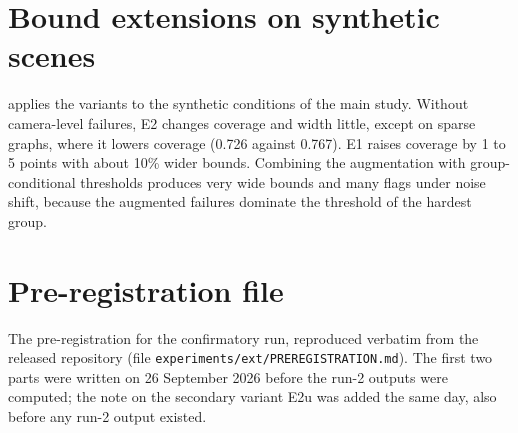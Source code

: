 \documentclass[preprint,12pt]{elsarticle}
\begin{document}
\section{Bound extensions on synthetic scenes}\label{sec:s6}
 applies the variants to the synthetic conditions of the main study. Without camera-level failures, E2 changes coverage and width little, except on sparse graphs, where it lowers coverage (0.726 against 0.767). E1 raises coverage by 1 to 5 points with about 10\% wider bounds. Combining the augmentation with group-conditional thresholds produces very wide bounds and many flags under noise shift, because the augmented failures dominate the threshold of the hardest group.



\clearpage
\section{Pre-registration file}\label{sec:s7}
The pre-registration for the confirmatory run, reproduced verbatim from the released repository (file \texttt{experiments/ext/PREREGISTRATION.md}). The first two parts were written on 26 September 2026 before the run-2 outputs were computed; the note on the secondary variant E2u was added the same day, also before any run-2 output existed.
\end{document}
